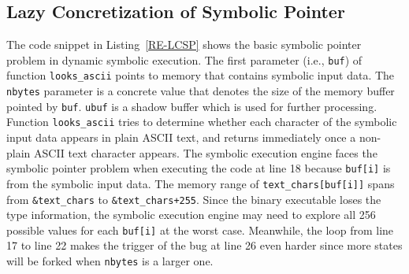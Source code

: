 \subsection{Lazy Concretization of Symbolic Pointer}
The code snippet in Listing~\ref{RE-LCSP} shows the basic symbolic pointer 
problem in dynamic symbolic execution. The first parameter 
(i.e., \texttt{buf}) of function \texttt{looks\_ascii} points to memory 
that contains symbolic input data. The \texttt{nbytes} parameter is a 
concrete value that denotes the size of the memory buffer pointed by 
\texttt{buf}. \texttt{ubuf} is a shadow buffer which is used for further 
processing. 
Function \texttt{looks\_ascii} tries to determine whether each character 
of the symbolic input data appears in plain ASCII text, and returns 
immediately once a non-plain ASCII text character appears. 
The symbolic execution engine faces the symbolic pointer problem when executing 
the code at line 18 because \texttt{buf[i]} is from the symbolic input data. 
The memory range of \texttt{text\_chars[buf[i]]} spans from \texttt{\&text\_chars} 
to \texttt{\&text\_chars+255}. Since the binary executable loses the 
type information, the symbolic execution engine may need to explore all 256 possible
values for each \texttt{buf[i]} at the worst case. Meanwhile, the loop from line
17 to line 22 makes the trigger of the bug at line 26 even harder since more
states will be forked when \texttt{nbytes} is a larger one.

